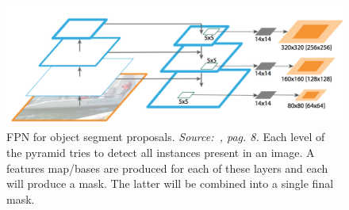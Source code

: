 \documentclass[10pt,twocolumn,letterpaper]{article}
\begin{document}
\begin{figure}[H]
\centering
  \includegraphics[width=0.8\linewidth]{./image/FPN.png} 
  \caption{FPN for object segment proposals. \textit{Source:~\cite{FPN}, pag. 8.}
Each level of the pyramid tries to detect all instances present in an image. A features map/bases are produced for each of these layers and each will produce a mask. The latter will be combined into a single final mask.}%
  \label{fig:FPN}
\noindent
\end{figure}
\end{document}
